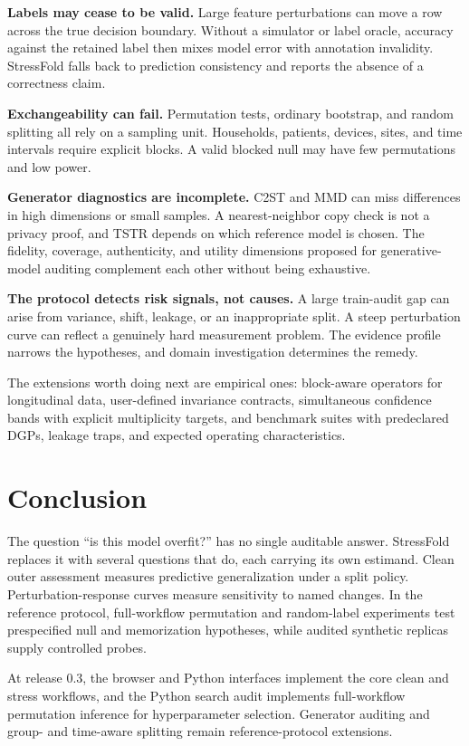 \documentclass[10pt,twocolumn]{article}
\begin{document}
\textbf{Labels may cease to be valid.} Large feature perturbations can move a row across the true decision boundary. Without a simulator or label oracle, accuracy against the retained label then mixes model error with annotation invalidity. StressFold falls back to prediction consistency and reports the absence of a correctness claim.

\textbf{Exchangeability can fail.} Permutation tests, ordinary bootstrap, and random splitting all rely on a sampling unit. Households, patients, devices, sites, and time intervals require explicit blocks. A valid blocked null may have few permutations and low power.

\textbf{Generator diagnostics are incomplete.} C2ST and MMD can miss differences in high dimensions or small samples. A nearest-neighbor copy check is not a privacy proof, and TSTR depends on which reference model is chosen. The fidelity, coverage, authenticity, and utility dimensions proposed for generative-model auditing \citep{alaa2022faithful} complement each other without being exhaustive.

\textbf{The protocol detects risk signals, not causes.} A large train-audit gap can arise from variance, shift, leakage, or an inappropriate split. A steep perturbation curve can reflect a genuinely hard measurement problem. The evidence profile narrows the hypotheses, and domain investigation determines the remedy.

The extensions worth doing next are empirical ones: block-aware operators for longitudinal data, user-defined invariance contracts, simultaneous confidence bands with explicit multiplicity targets, and benchmark suites with predeclared DGPs, leakage traps, and expected operating characteristics.

\section{Conclusion}

The question ``is this model overfit?'' has no single auditable answer. StressFold replaces it with several questions that do, each carrying its own estimand. Clean outer assessment measures predictive generalization under a split policy. Perturbation-response curves measure sensitivity to named changes. In the reference protocol, full-workflow permutation and random-label experiments test prespecified null and memorization hypotheses, while audited synthetic replicas supply controlled probes.

At release 0.3, the browser and Python interfaces implement the core clean and stress workflows, and the Python search audit implements full-workflow permutation inference for hyperparameter selection. Generator auditing and group- and time-aware splitting remain reference-protocol extensions.
\end{document}
